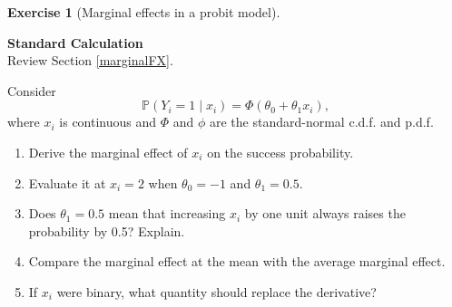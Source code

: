 \documentclass[
  11pt,
]{book}
\providecommand{\tightlist}{%
  \setlength{\itemsep}{0pt}\setlength{\parskip}{0pt}}
\theoremstyle{definition}
\theoremstyle{definition}
\theoremstyle{definition}
\newtheorem{exercise}{Exercise}[chapter]
\theoremstyle{definition}
\theoremstyle{remark}
\begin{document}
\begin{exercisebox}

\begin{exercise}[Marginal effects in a probit model]
\protect\hypertarget{exr:binary-marginal-effects}{}\label{exr:binary-marginal-effects}

\textbf{Standard \textbar{} Calculation}\\
Review Section \ref{marginalFX}.

Consider
\[
\mathbb{P}(Y_i=1\mid x_i)=\Phi(\theta_0+\theta_1x_i),
\]
where \(x_i\) is continuous and \(\Phi\) and \(\phi\) are the standard-normal c.d.f. and p.d.f.

\begin{enumerate}
\def\labelenumi{\arabic{enumi}.}
\tightlist
\item
  Derive the marginal effect of \(x_i\) on the success probability.
\item
  Evaluate it at \(x_i=2\) when \(\theta_0=-1\) and \(\theta_1=0.5\).
\item
  Does \(\theta_1=0.5\) mean that increasing \(x_i\) by one unit always raises the probability by 0.5? Explain.
\item
  Compare the marginal effect at the mean with the average marginal effect.
\item
  If \(x_i\) were binary, what quantity should replace the derivative?
\end{enumerate}

\end{exercise}

\end{exercisebox}

\end{document}
